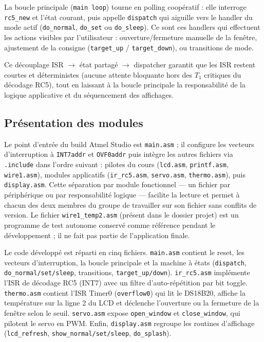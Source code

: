 \documentclass[11pt]{article}
\begin{document}
La boucle principale (\texttt{main loop}) tourne en polling coopératif : elle interroge \texttt{rc5\_new} et l'état courant, puis appelle \texttt{dispatch} qui aiguille vers le handler du mode actif (\texttt{do\_normal}, \texttt{do\_set} ou \texttt{do\_sleep}). Ce sont ces handlers qui effectuent les actions visibles par l'utilisateur : ouverture/fermeture manuelle de la fenêtre, ajustement de la consigne (\texttt{target\_up} / \texttt{target\_down}), ou transitions de mode.

Ce découplage ISR $\rightarrow$ état partagé $\rightarrow$ dispatcher garantit que les ISR restent courtes et déterministes (aucune attente bloquante hors des $T_1$ critiques du décodage RC5), tout en laissant à la boucle principale la responsabilité de la logique applicative et du séquencement des affichages.


\subsection{Présentation des modules}

Le point d'entrée du build Atmel Studio est \texttt{main.asm} ; il configure les vecteurs d'interruption à \texttt{INT7addr} et \texttt{OVF0addr} puis intègre les autres fichiers via \texttt{.include} dans l'ordre suivant : pilotes du cours (\texttt{lcd.asm}, \texttt{printf.asm}, \texttt{wire1.asm}), modules applicatifs (\texttt{ir\_rc5.asm}, \texttt{servo.asm}, \texttt{thermo.asm}), puis \texttt{display.asm}. Cette séparation par module fonctionnel --- un fichier par périphérique ou par responsabilité logique --- facilite la lecture et permet à chacun des deux membres du groupe de travailler sur son fichier sans conflits de version. Le fichier \texttt{wire1\_temp2.asm} (présent dans le dossier projet) est un programme de test autonome conservé comme référence pendant le développement ; il ne fait pas partie de l'application finale.

Le code développé est réparti en cinq fichiers. \texttt{main.asm} contient le reset, les vecteurs d'interruption, la boucle principale et la machine à états (\texttt{dispatch}, \texttt{do\_normal/set/sleep}, transitions, \texttt{target\_up/down}). \texttt{ir\_rc5.asm} implémente l'ISR de décodage RC5 (INT7) avec un filtre d'auto-répétition par bit toggle. \texttt{thermo.asm} contient l'ISR Timer0 (\texttt{overflow0}) qui lit le DS18B20, affiche la température sur la ligne 2 du LCD et déclenche l'ouverture ou la fermeture de la fenêtre selon le seuil. \texttt{servo.asm} expose \texttt{open\_window} et \texttt{close\_window}, qui pilotent le servo en PWM. Enfin, \texttt{display.asm} regroupe les routines d'affichage (\texttt{lcd\_refresh}, \texttt{show\_normal/set/sleep}, \texttt{do\_splash}).
\end{document}
